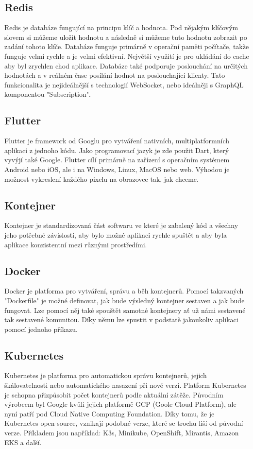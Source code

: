 \subsection{Redis}
Redis je databáze fungující na principu klíč a hodnota. Pod nějakým klíčovým slovem si můžeme uložit hodnotu a následně si můžeme tuto hodnotu zobrazit po zadání tohoto klíče. Databáze funguje primárně v operační paměti počítače, takže funguje velmi rychle a je velmi efektivní. Největší využití je pro ukládání do cache aby byl zrychlen chod aplikace. Databáze také podporuje poslouchání na určitých hodnotách a v reálném čase posílání hodnot na poslouchající klienty. Tato funkcionalita je nejideálnější s technologií WebSocket, nebo ideálněji s GraphQL komponentou "Subscription".

\subsection{Flutter}
Flutter je framework od Googlu pro vytváření nativních, multiplatformních aplikací z jednoho kódu. \cite{Flutter} Jako programovací jazyk je zde použit Dart, který vyvýjí také Google. Flutter cílí primárně na zařízení s operačním systémem Android nebo iOS, ale i na Windows, Linux, MacOS nebo web. Výhodou je možnost vykreslení každého pixelu na obrazovce tak, jak chceme.

\subsection{Kontejner}
Kontejner je standardizovaná část softwaru ve které je zabalený kód a všechny jeho potřebné závislosti, aby bylo možné aplikaci rychle spuštět a aby byla aplikace konzistentní mezi různými prostředími. \cite{Kontejner}

\subsection{Docker}
Docker je platforma pro vytváření, správu a běh kontejnerů. Pomocí takzvaných "Dockerfile" je možné definovat, jak bude výsledný kontejner sestaven a jak bude fungovat. Lze pomocí něj také spouštět samotné kontejnery ať už námi sestavené tak sestavené komunitou. Díky němu lze spustit v podstatě jakoukoliv aplikaci pomocí jednoho příkazu.

\subsection{Kubernetes}
Kubernetes je platforma pro automatickou správu kontejnerů, jejich škálovatelnosti nebo automatického nasazení při nové verzi. Platform Kubernetes je schopna přizpůsobit počet kontejnerů podle aktuální zátěže. 
Původním výrobcem byl Google kvůli jejich platformě GCP (Goole Cloud Platform), ale nyní patří pod Cloud Native Computing Foundation. Díky tomu, že je Kubernetes open-source, vznikají podobné verze, které se trochu liší od původní verze. Příkladem jsou například: K3s, Minikube, OpenShift, Mirantis, Amazon EKS a další.

